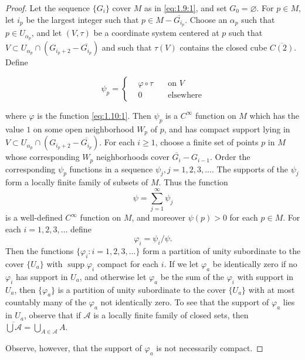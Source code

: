 \begin{proof}
	Let the sequence $\{G_i\}$ cover $M$ as in
	\eqref{eq:1.9:1}, and set $G_0 = \varnothing$.
	For $p \in M$, let $i_p$ be the largest integer such
	that $p \in M - \overline{G_{i_p}}$. Choose an
	$\alpha_p$ such that $p \in U_{\alpha_p}$, and let $(V, \tau)$
	be a coordinate system centered at $p$ such that
	$V \subset U_{\alpha_p} \cap (G_{i_p+2} - \overline{G_{i_p}})$
	and such that $\tau(V)$ contains the closed cube $\overline{C(2)}$. Define

	\begin{equation}
		\label{eq:1.11:1}
		\psi_{p}=\left\{\begin{aligned}{}&{{}\varphi\circ\tau}&{\quad\text{on }V}\\ {}&{{}0}&{\quad\text{elsewhere}} \end{aligned}\right.
	\end{equation}

	where $\varphi$ is the function \eqref{eq:1.10:1}.
	Then $\psi_p$ is a $C^\infty$ function on $M$ which has the value $1$ on some
	open neighborhood $W_p$ of $p$, and has compact support lying in
	$V \subset U_{\alpha_p} \cap (G_{i_p+2} - \overline{G_{i_p}})$.
	For each $i \geq 1$, choose a finite set of points $p$ in $M$
	whose corresponding $W_p$ neighborhoods cover
	$\overline{G_i} - G_{i-1}$. Order the corresponding $\psi_p$
	functions in a sequence $\psi_j, j=1,2,3,\ldots$. The
	supports of the $\psi_j$ form a locally finite family of subsets of $M$.
	Thus the function
	\begin{equation}
		\label{eq:1.11:2}
		\psi=\sum_{j=1}^{\infty}\psi_{j}
	\end{equation}
	is a well-defined $C^{\infty}$ function on $M$, and moreover
	$\psi(p) > 0$ for each $p \in M$. For each $i = 1, 2, 3, \ldots$ define
	\begin{equation}
		\label{eq:1.11:3}
		\varphi_{i}=\psi_{i}/\psi.
	\end{equation}
	Then the functions $\{\varphi_i: i=1,2,3,\ldots\}$ form a partition
	of unity subordinate to the cover $\{U_a\}$ with
	$\operatorname{supp} \varphi_i$ compact for each $i$.
	If we let $\varphi_a$ be identically zero if no
	$\varphi_i$ has support in $U_a$, and otherwise let
	$\varphi_a$ be the sum of the $\varphi_i$ with support in $U_a$,
	then $\{\varphi_a\}$ is a partition of unity subordinate to
	the cover $\{U_a\}$ with at most countably many of the $\varphi_a$
	not identically zero. To see that the support of $\varphi_a$
	lies in $U_a$, observe that if $\mathcal{A}$ is a locally
	finite family of closed sets, then $\overline{\bigcup\mathcal{A}} = \bigcup_{A\in\mathcal{A}}A$.

	Observe, however, that the support of $\varphi_{a}$ is not necessarily compact.
\end{proof}

